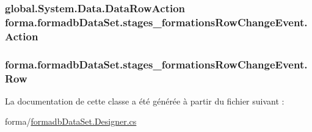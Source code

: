 \subsubsection[{\texorpdfstring{Action}{Action}}]{\setlength{\rightskip}{0pt plus 5cm}global.\+System.\+Data.\+Data\+Row\+Action forma.\+formadb\+Data\+Set.\+stages\+\_\+formations\+Row\+Change\+Event.\+Action\hspace{0.3cm}{\ttfamily [get]}}\hypertarget{classforma_1_1formadb_data_set_1_1stages__formations_row_change_event_aef4417b06c8e367de92656179d503d87}{}\label{classforma_1_1formadb_data_set_1_1stages__formations_row_change_event_aef4417b06c8e367de92656179d503d87}
\subsubsection[{\texorpdfstring{Row}{Row}}]{ forma.\+formadb\+Data\+Set.\+stages\+\_\+formations\+Row\+Change\+Event.\+Row\hspace{0.3cm}{\ttfamily [get]}}\hypertarget{classforma_1_1formadb_data_set_1_1stages__formations_row_change_event_ad1f4185d33dae5fd357603be0bb596a6}{}\label{classforma_1_1formadb_data_set_1_1stages__formations_row_change_event_ad1f4185d33dae5fd357603be0bb596a6}


La documentation de cette classe a été générée à partir du fichier suivant \+:\begin{DoxyCompactItemize}
\item 
forma/\hyperlink{formadb_data_set_8_designer_8cs}{formadb\+Data\+Set.\+Designer.\+cs}\end{DoxyCompactItemize}
